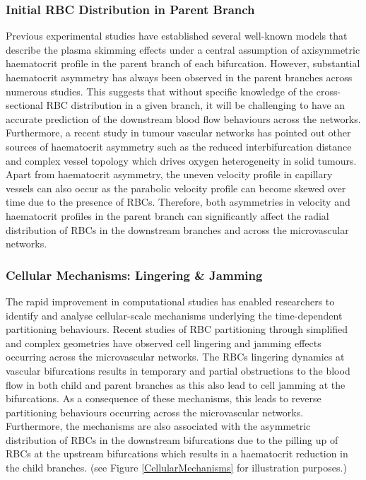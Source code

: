 \subsubsection{Initial RBC Distribution in Parent Branch}
\label{InitialRBCDistributionInPB}
\noindent Previous experimental studies have established several well-known models\cite{PRIES198981, GuibertR2010ANAt, Gould2015HematocritNetworks, LeeTae-Rin2017Gpsm} that describe the plasma skimming effects under a central assumption of axisymmetric haematocrit profile in the parent branch of each bifurcation. However, substantial haematocrit asymmetry has always been observed in the parent branches across numerous studies.\cite{Zhou2021EmergentBifurcations, 2020Charles} This suggests that without specific knowledge of the cross-sectional RBC distribution in a given branch, it will be challenging to have an accurate prediction of the downstream blood flow behaviours across the networks. Furthermore, a recent study in tumour vascular networks has pointed out other sources of haematocrit asymmetry such as the reduced interbifurcation distance and complex vessel topology which drives oxygen heterogeneity in solid tumours.\cite{Bernabeu2020AbnormalOxygenation} Apart from haematocrit asymmetry, the uneven velocity profile in capillary vessels can also occur as the parabolic velocity profile can become skewed over time due to the presence of RBCs.\cite{2020Charles, JosephAby2019Isbf, Balogh2018, Balogh2017DirectNetworks} Therefore, both asymmetries in velocity and haematocrit profiles in the parent branch can significantly affect the radial distribution of RBCs in the downstream branches and across the microvascular networks.


\subsubsection{Cellular Mechanisms: Lingering \& Jamming}
\noindent The rapid improvement in computational studies has enabled researchers to identify and analyse cellular-scale mechanisms underlying the time-dependent partitioning behaviours. Recent studies of RBC partitioning through simplified and complex geometries\cite{wang_sui_salsac_barthes-biesel_wang_2016, Balogh2018, Balogh2017DirectNetworks} have observed cell lingering and jamming effects occurring across the microvascular networks. The RBCs lingering dynamics at vascular bifurcations results in temporary and partial obstructions to the blood flow in both child and parent branches as this also lead to cell jamming at the bifurcations. As a consequence of these mechanisms, this leads to reverse partitioning behaviours occurring across the microvascular networks.\cite{Balogh2017DirectNetworks} Furthermore, the mechanisms are also associated with the asymmetric distribution of RBCs in the downstream bifurcations due to the pilling up of RBCs at the upstream bifurcations which results in a haematocrit reduction in the child branches.\cite{Balogh2018} (see Figure \ref {CellularMechanisms} for illustration purposes.)

